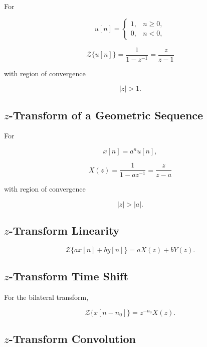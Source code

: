 For

\[
u[n]
=
\begin{cases}
1, & n\geq0,\\
0, & n<0,
\end{cases}
\]

\[
\boxed{
\mathcal{Z}\{u[n]\}
=
\frac{1}{1-z^{-1}}
=
\frac{z}{z-1}
}
\]

with region of convergence

\[
\boxed{
|z|>1.
}
\]

\subsection{\(z\)-Transform of a Geometric Sequence}
\label{subsec:z-transform-geometric}

For

\[
x[n]
=
a^n u[n],
\]

\[
\boxed{
X(z)
=
\frac{1}{1-az^{-1}}
=
\frac{z}{z-a}
}
\]

with region of convergence

\[
\boxed{
|z|>|a|.
}
\]

\subsection{\(z\)-Transform Linearity}
\label{subsec:z-transform-linearity}

\[
\boxed{
\mathcal{Z}\{ax[n]+by[n]\}
=
aX(z)+bY(z).
}
\]

\subsection{\(z\)-Transform Time Shift}
\label{subsec:z-transform-time-shift}

For the bilateral transform,

\[
\boxed{
\mathcal{Z}
\{
x[n-n_0]
\}
=
z^{-n_0}X(z).
}
\]

\subsection{\(z\)-Transform Convolution}
\label{subsec:z-transform-convolution}

